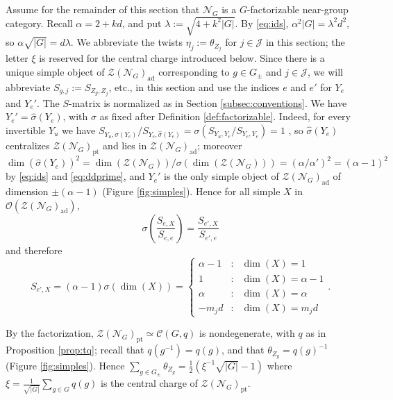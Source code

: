 \documentclass[10pt]{article}
\theoremstyle{plain}
\theoremstyle{definition}
\theoremstyle{plain}
\begin{document}
Assume for the remainder of this section that $\mathcal{N}_G$ is a $G$-factorizable near-group category. Recall $\alpha=2+kd$, and put $\lambda:=\sqrt{4+k^2|G|}$. By \eqref{eq:ids}, $\alpha^2|G|=\lambda^2d^2$, so $\alpha\sqrt{|G|}=d\lambda$.  We abbreviate the twists $\eta_j:=\theta_{Z_j}$ for $j\in\mathcal{J}$ in this section; the letter $\xi$ is reserved for the central charge introduced below. Since there is a unique simple object of $\mathcal{Z}(\mathcal{N}_G)_\mathrm{ad}$ corresponding to $g\in G_{\pm}$ and $j\in\mathcal{J}$, we will abbreviate $S_{g,j}:=S_{Z_g,Z_j}$, etc., in this section and use the indices $e$ and $e'$ for $Y_e$ and $Y_e'$. The $S$-matrix is normalized as in Section \ref{subsec:conventions}. We have $Y_e'=\hat\sigma(Y_e)$, with $\sigma$ as fixed after Definition \ref{def:factorizable}. Indeed, for every invertible $Y_u$ we have $S_{Y_u,\hat\sigma(Y_e)}/S_{Y_e,\hat\sigma(Y_e)}=\sigma(S_{Y_u,Y_e}/S_{Y_e,Y_e})=1$ \cite[Section 2]{MR3486174}, so $\hat\sigma(Y_e)$ centralizes $\mathcal{Z}(\mathcal{N}_G)_\mathrm{pt}$ and lies in $\mathcal{Z}(\mathcal{N}_G)_\mathrm{ad}$; moreover $\dim(\hat\sigma(Y_e))^2=\dim(\mathcal{Z}(\mathcal{N}_G))/\sigma(\dim(\mathcal{Z}(\mathcal{N}_G)))=(\alpha/\alpha')^2=(\alpha-1)^2$ by \eqref{eq:ids} and \eqref{eq:ddprime}, and $Y_e'$ is the only simple object of $\mathcal{Z}(\mathcal{N}_G)_\mathrm{ad}$ of dimension $\pm(\alpha-1)$ (Figure \ref{fig:simples}). Hence for all simple $X$ in $\mathcal{O}(\mathcal{Z}(\mathcal{N}_G)_\mathrm{ad})$,
\begin{equation}
\sigma\left(\dfrac{S_{e,X}}{S_{e,e}}\right)=\dfrac{S_{e',X}}{S_{e',e}}
\end{equation}
and therefore
\begin{equation}
S_{e',X}=(\alpha-1)\sigma\left(\dim(X)\right)=\left\{\begin{array}{ccl}
\alpha-1 & : & \dim(X)=1 \\
1 & : & \dim(X)=\alpha-1 \\
\alpha & : & \dim(X)=\alpha \\
-m_jd & : & \dim(X)=m_jd
\end{array}\right..
\end{equation}

By the factorization, $\mathcal{Z}(\mathcal{N}_G)_\mathrm{pt}\simeq\mathcal{C}(G,q)$ is nondegenerate, with $q$ as in Proposition \ref{prop:tq}; recall that $q(g^{-1})=q(g)$, and that $\theta_{Z_g}=q(g)^{-1}$ (Figure \ref{fig:simples}). Hence $\sum_{g\in G_{\pm}}\theta_{Z_g}=\frac{1}{2}(\xi^{-1}\sqrt{|G|}-1)$ where $\xi=\frac{1}{\sqrt{|G|}}\sum_{g\in G}q(g)$ is the central charge of $\mathcal{Z}(\mathcal{N}_G)_\mathrm{pt}$.
\end{document}
